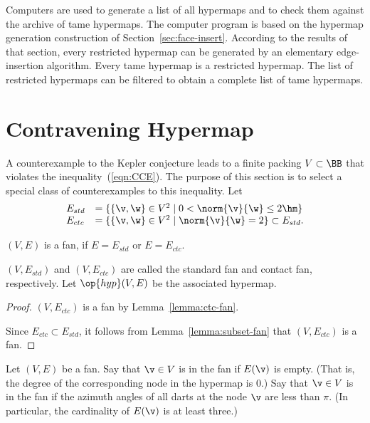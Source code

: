 Computers are used to generate a list of all hypermaps and to check
them against the archive of tame hypermaps.  The computer program is
based on the hypermap generation construction of
Section~\ref{sec:face-insert}.  According to the results of that
section, every restricted hypermap can be generated by an elementary
edge-insertion algorithm.  Every tame hypermap is a restricted
hypermap.  The list of restricted hypermaps can be filtered to obtain
a complete list of tame hypermaps.  %

\section{Contravening Hypermap}

%
A counterexample to the Kepler conjecture leads to a finite packing
$V\subset \BB$ that violates the inequality~(\ref{eqn:CCE}).  The
purpose of this section is to select a special class of
counterexamples to this inequality.  Let
\begin{equation}\label{eqn:fan-edge}
\begin{array}{lll}
E_{std} &= \{\{\v,\w\}\in V^2\mid 0 < \norm{\v}{\w}\le 2\hm \}\\
E_{ctc} &= \{\{\v,\w\}\in V^2\mid \norm{\v}{\w}= 2 \}\subset E_{std}.
\end{array}
\end{equation}

\begin{lemma}[]
$(V,E)$ is a fan, if $E=E_{std}$ or $E=E_{ctc}$.
\end{lemma}
$(V,E_{std})$ and $(V,E_{ctc})$ are called the standard fan and
contact fan, respectively.  Let $\op{hyp}(V,E)$ be the associated
hypermap.  %
%
%
%
%
%
%

\begin{proof} 
$(V,E_{ctc})$ is a fan by Lemma~\ref{lemma:ctc-fan}.

Since $E_{ctc}\subset E_{std}$, it follows from
Lemma~\ref{lemma:subset-fan} that $(V,E_{ctc})$ is a fan.
\end{proof}

\begin{definition}
  Let $(V,E)$ be a fan.  Say that $\v\in V$ is  in
  the fan if $E(\v)$ is empty.  (That is, the degree of the
  corresponding node in the hypermap is $0$.) Say that $\v\in V$ is
   in the fan if the azimuth angles of all darts
  at the node $\v$ are less than $\pi$.  (In particular, the
  cardinality of $E(\v)$ is at least three.)
\end{definition}
%
%
%
%
%
%

